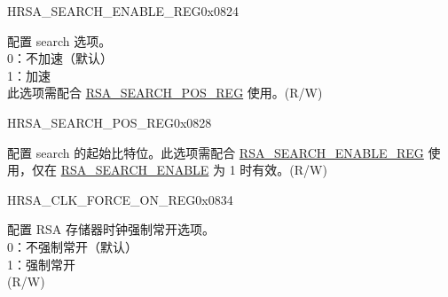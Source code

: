 \begin{register}{H}{RSA\_SEARCH\_ENABLE\_REG}{0x0824}\label{regdesc:RSASEARCHENABLEREG}
%
%
\regnewline%
\begin{regdesc}\begin{reglist}
\label{fielddesc:RSASEARCHENABLE}\item [RSA\_SEARCH\_ENABLE] 配置 search 选项。\\
0：不加速（默认）\\
1：加速\\
此选项需配合 \hyperref[regdesc:RSASEARCHPOSREG]{RSA\_SEARCH\_POS\_REG} 使用。(R/W)
\end{reglist}\end{regdesc}
\end{register}


\begin{register}{H}{RSA\_SEARCH\_POS\_REG}{0x0828}\label{regdesc:RSASEARCHPOSREG}
%
%
\regnewline%
\begin{regdesc}\begin{reglist}
\label{fielddesc:RSASEARCHPOS}\item [RSA\_SEARCH\_POS] 配置 search 的起始比特位。此选项需配合 \hyperref[regdesc:RSASEARCHENABLEREG]{RSA\_SEARCH\_ENABLE\_REG} 使用，仅在 \hyperref[fielddesc:RSASEARCHENABLE]{RSA\_SEARCH\_ENABLE} 为 1 时有效。(R/W)
\end{reglist}\end{regdesc}
\end{register}


\begin{register}{H}{RSA\_CLK\_FORCE\_ON\_REG}{0x0834}\label{regdesc:RSACLKFORCEONREG}
%
%
\regnewline%
\begin{regdesc}\begin{reglist}
\label{fielddesc:RSAMEMCLKFORCEON}\item [RSA\_MEM\_CLK\_FORCE\_ON] 配置 RSA 存储器时钟强制常开选项。\\
0：不强制常开（默认）\\
1：强制常开\\
 (R/W)
\end{reglist}\end{regdesc}
\end{register}

